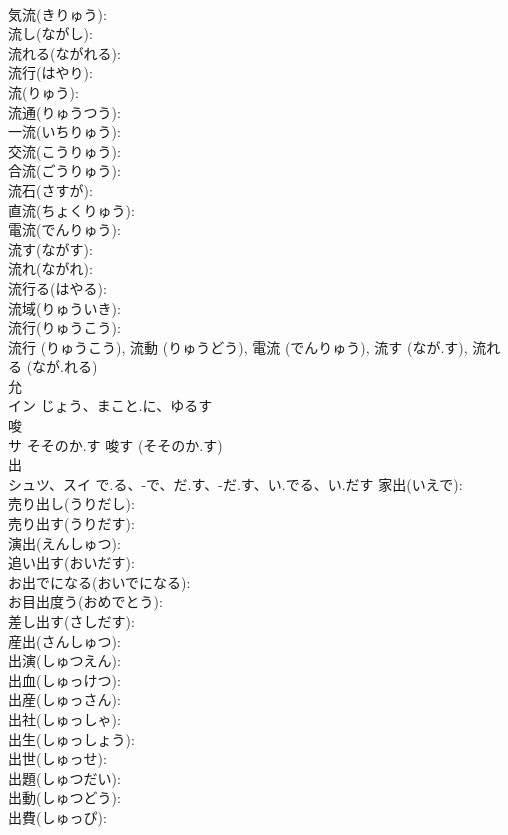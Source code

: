 \documentclass[8pt]{extreport}
\begin{document}
\begin{CJK}{UTF8}{min}
\\	気流(きりゅう): 
\\	流し(ながし): 
\\	流れる(ながれる): 
\\	流行(はやり): 
\\	流(りゅう): 
\\	流通(りゅうつう): 
\\	一流(いちりゅう): 
\\	交流(こうりゅう): 
\\	合流(ごうりゅう): 
\\	流石(さすが): 
\\	直流(ちょくりゅう): 
\\	電流(でんりゅう): 
\\	流す(ながす): 
\\	流れ(ながれ): 
\\	流行る(はやる): 
\\	流域(りゅういき): 
\\	流行(りゅうこう): 
\\	流行 (りゅうこう), 流動 (りゅうどう), 電流 (でんりゅう), 流す (なが.す), 流れる (なが.れる)
\\	允			
\\	イン	じょう、まこと.に、ゆるす		
\\	唆			
\\	サ	そそのか.す		唆す (そそのか.す)
\\	出			
\\	シュツ、スイ	で.る、-で、だ.す、-だ.す、い.でる、い.だす	家出(いえで): 
\\	売り出し(うりだし): 
\\	売り出す(うりだす): 
\\	演出(えんしゅつ): 
\\	追い出す(おいだす): 
\\	お出でになる(おいでになる): 
\\	お目出度う(おめでとう): 
\\	差し出す(さしだす): 
\\	産出(さんしゅつ): 
\\	出演(しゅつえん): 
\\	出血(しゅっけつ): 
\\	出産(しゅっさん): 
\\	出社(しゅっしゃ): 
\\	出生(しゅっしょう): 
\\	出世(しゅっせ): 
\\	出題(しゅつだい): 
\\	出動(しゅつどう): 
\\	出費(しゅっぴ): 

\end{CJK}
\end{document}
